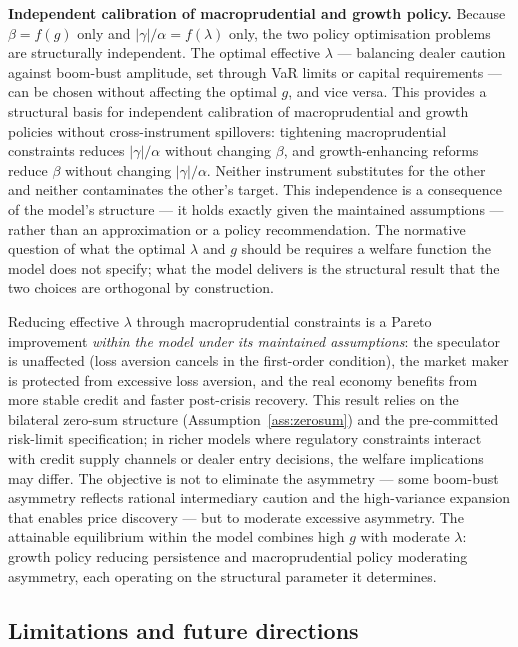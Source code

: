 \documentclass[12pt,a4paper]{article}
\theoremstyle{definition}
\begin{document}
\noindent\textbf{Independent calibration of macroprudential and growth policy.}
Because $\beta = f(g)$ only and $|\gamma|/\alpha = f(\lambda)$ only,
the two policy optimisation problems are structurally independent.
The optimal effective $\lambda$ --- balancing dealer caution against
boom-bust amplitude, set through VaR limits or capital requirements ---
can be chosen without affecting the optimal $g$, and vice versa. This
provides a structural basis for independent calibration of macroprudential
and growth policies without cross-instrument spillovers: tightening
macroprudential constraints reduces $|\gamma|/\alpha$ without changing
$\beta$, and growth-enhancing reforms reduce $\beta$ without changing
$|\gamma|/\alpha$. Neither instrument substitutes for the other and
neither contaminates the other's target. This independence is a
consequence of the model's structure --- it holds exactly given the
maintained assumptions --- rather than an approximation or a policy
recommendation. The normative question of what the optimal $\lambda$ and
$g$ should be requires a welfare function the model does not specify;
what the model delivers is the structural result that the two choices
are orthogonal by construction.

Reducing effective $\lambda$ through macroprudential constraints is a
Pareto improvement \emph{within the model under its maintained
assumptions}: the speculator is unaffected
(loss aversion cancels in the first-order condition), the market maker
is protected from excessive loss aversion, and the real economy benefits
from more stable credit and faster post-crisis recovery. This result
relies on the bilateral zero-sum structure (Assumption~\ref{ass:zerosum})
and the pre-committed risk-limit specification; in richer models where
regulatory constraints interact with credit supply channels or dealer
entry decisions, the welfare implications may differ. The objective
is not to eliminate the asymmetry --- some boom-bust asymmetry reflects
rational intermediary caution and the high-variance expansion that
enables price discovery --- but to moderate excessive asymmetry. The
attainable equilibrium within the model combines high $g$ with moderate
$\lambda$: growth policy reducing persistence and macroprudential policy
moderating asymmetry, each operating on the structural parameter it
determines.

\subsection{Limitations and future directions}
\label{sec:limitations}
\end{document}
